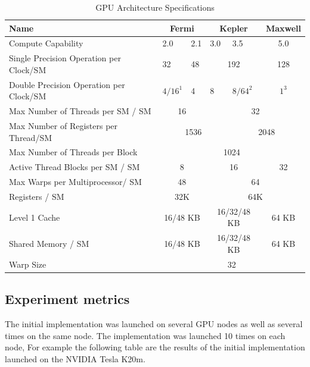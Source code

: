 \begin{table}[h]
\centering
  \begin{tabular} { | l | l  | l | l | l  |  l  | l |}
    \hline
    Name & \multicolumn{2}{|c|}{Fermi} & \multicolumn{2}{|c|}{Kepler} &  \multicolumn{2}{|c|}{Maxwell} \\
    \hline
    Compute Capability & 2.0 & 2.1 & 3.0 & 3.5 & \multicolumn{2}{|c|}{5.0}\\
   \hline
    Single Precision Operation per Clock/SM & 32 & 48 & \multicolumn{2}{|c|}{192} & \multicolumn{2}{|c|}{128}\\
   \hline
    Double Precision Operation per Clock/SM & $4/16^1$ & 4 & 8 & $8/64^2$ & \multicolumn{2}{|c|}{$1^3$}\\
   \hline
    Max Number of Threads per SM / SM & \multicolumn{2}{|c|}{16} & \multicolumn{4}{|c|}{32}\\
   \hline
    Max Number of Registers per Thread/SM & \multicolumn{3}{|c|}{1536} & \multicolumn{3}{|c|}{2048}\\
   \hline
       Max Number of Threads per Block & \multicolumn{6}{|c|}{1024}\\
   \hline
   Active Thread Blocks per SM / SM & \multicolumn{2}{|c|}{8} & \multicolumn{2}{|c|}{16} & \multicolumn{2}{|c|}{32}\\
   \hline
   Max Warps per Multiprocessor/ SM & \multicolumn{2}{|c|}{48} & \multicolumn{4}{|c|}{64}\\
   \hline
   Registers / SM & \multicolumn{2}{|c|}{32K} & \multicolumn{4}{|c|}{64K}\\
   \hline
   Level 1 Cache & \multicolumn{2}{|c|}{16/48 KB} & \multicolumn{2}{|c|}{16/32/48 KB} & \multicolumn{2}{|c|}{64 KB}\\
   \hline
   Shared Memory / SM & \multicolumn{2}{|c|}{16/48 KB} & \multicolumn{2}{|c|}{16/32/48 KB} & \multicolumn{2}{|c|}{64 KB}\\
   \hline
   Warp Size & \multicolumn{6}{c|}{32}  \\
   \hline
  \end{tabular}
  \caption{GPU Architecture Specifications}
  \label{tab:arch}
  \end{table}
  
\subsection{Experiment metrics}

The initial implementation was launched on several GPU nodes as well as several times on the same node. The implementation was launched 10 times on each node, For example the following table are the results of the initial implementation launched on the NVIDIA Tesla K20m.

